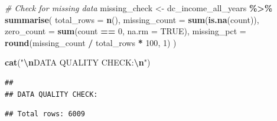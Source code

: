 \documentclass[
]{article}
\newenvironment{Shaded}{\begin{snugshade}}{\end{snugshade}}
\newcommand{\AttributeTok}[1]{\textcolor[rgb]{0.13,0.29,0.53}{#1}}
\newcommand{\CommentTok}[1]{\textcolor[rgb]{0.56,0.35,0.01}{\textit{#1}}}
\newcommand{\ConstantTok}[1]{\textcolor[rgb]{0.56,0.35,0.01}{#1}}
\newcommand{\DecValTok}[1]{\textcolor[rgb]{0.00,0.00,0.81}{#1}}
\newcommand{\FunctionTok}[1]{\textcolor[rgb]{0.13,0.29,0.53}{\textbf{#1}}}
\newcommand{\NormalTok}[1]{#1}
\newcommand{\OtherTok}[1]{\textcolor[rgb]{0.56,0.35,0.01}{#1}}
\newcommand{\SpecialCharTok}[1]{\textcolor[rgb]{0.81,0.36,0.00}{\textbf{#1}}}
\newcommand{\StringTok}[1]{\textcolor[rgb]{0.31,0.60,0.02}{#1}}
\begin{document}
\begin{Shaded}
\begin{Highlighting}[]
\CommentTok{\# Check for missing data}
\NormalTok{missing\_check }\OtherTok{\textless{}{-}}\NormalTok{ dc\_income\_all\_years }\SpecialCharTok{\%\textgreater{}\%}
  \FunctionTok{summarise}\NormalTok{(}
    \AttributeTok{total\_rows =} \FunctionTok{n}\NormalTok{(),}
    \AttributeTok{missing\_count =} \FunctionTok{sum}\NormalTok{(}\FunctionTok{is.na}\NormalTok{(count)),}
    \AttributeTok{zero\_count =} \FunctionTok{sum}\NormalTok{(count }\SpecialCharTok{==} \DecValTok{0}\NormalTok{, }\AttributeTok{na.rm =} \ConstantTok{TRUE}\NormalTok{),}
    \AttributeTok{missing\_pct =} \FunctionTok{round}\NormalTok{(missing\_count }\SpecialCharTok{/}\NormalTok{ total\_rows }\SpecialCharTok{*} \DecValTok{100}\NormalTok{, }\DecValTok{1}\NormalTok{)}
\NormalTok{  )}

\FunctionTok{cat}\NormalTok{(}\StringTok{"}\SpecialCharTok{\textbackslash{}n}\StringTok{DATA QUALITY CHECK:}\SpecialCharTok{\textbackslash{}n}\StringTok{"}\NormalTok{)}
\end{Highlighting}
\end{Shaded}

\begin{verbatim}
## 
## DATA QUALITY CHECK:
\end{verbatim}

\begin{Shaded}
\end{Shaded}

\begin{verbatim}
## Total rows: 6009
\end{verbatim}

\begin{Shaded}
\end{Shaded}
\end{document}
